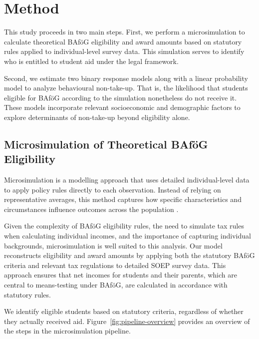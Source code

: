 %
%


\section{Method} 
This study proceeds in two main steps. 
First, we perform a microsimulation to calculate theoretical BAföG eligibility and award amounts based on statutory rules applied to individual-level survey data. 
This simulation serves to identify who is entitled to student aid under the legal framework. 

Second, we estimate two binary response models along with a linear probability model to analyze behavioural non-take-up.
That is, the likelihood that students eligible for BAföG according to the simulation nonetheless do not receive it. 
These models incorporate relevant socioeconomic and demographic factors to explore determinants of non-take-up beyond eligibility alone.

%
%
\subsection{Microsimulation of Theoretical BAföG Eligibility}

Microsimulation is a modelling approach that uses detailed individual-level data to apply policy rules directly to each observation. Instead of relying on representative averages, this method captures how specific characteristics and circumstances influence outcomes across the population \citep{klevmarken_microsimulation_2022}.

Given the complexity of BAföG eligibility rules, the need to simulate tax rules when calculating individual incomes, and the importance of capturing individual backgrounds, microsimulation is well suited to this analysis. 
Our model reconstructs eligibility and award amounts by applying both the statutory BAföG criteria and relevant tax regulations to detailed SOEP survey data. 
This approach ensures that net incomes for students and their parents, which are central to means-testing under BAföG, are calculated in accordance with statutory rules.

We identify eligible students based on statutory criteria, regardless of whether they actually received aid. Figure~\ref{fig:pipeline-overview} provides an overview of the steps in the microsimulation pipeline.

